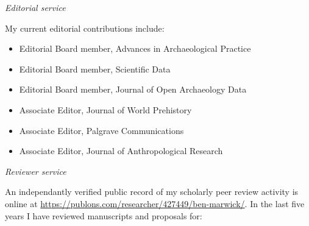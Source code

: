 \noindent\emph{Editorial service\vspace{0.01in}}

\medskip

My current editorial contributions include:

\begin{itemize}[noitemsep, font=$\bullet$\scshape\bfseries]
\item Editorial Board member, Advances in Archaeological Practice
\item Editorial Board member, Scientific Data
\item Editorial Board member, Journal of Open Archaeology Data
\item Associate Editor, Journal of World Prehistory
\item Associate Editor, Palgrave Communications 
\item Associate Editor, Journal of Anthropological Research
\end{itemize}

\medskip

\noindent\emph{Reviewer service\vspace{0.01in}}

\medskip

An independantly verified public record of my scholarly peer review activity is online at \href{https://publons.com/researcher/427449/ben-marwick}{https://publons.com/researcher/427449/ben-marwick/}. In the last five years I have reviewed manuscripts and proposals for:

